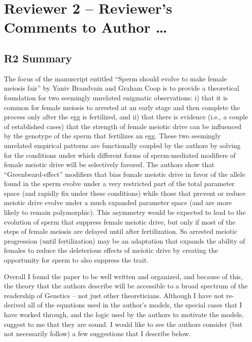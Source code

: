 \documentclass[12pt,letterpaper]{article}
\begin{document}
\newpage

\section*{Reviewer 2 -- Reviewer's Comments to Author \dots}

\subsection*{R2 Summary}
The focus of the manuscript entitled  ``Sperm should evolve to make female meiosis
fair'' by Yaniv Brandvain and Graham Coop is to provide a theoretical foundation
for two seemingly unrelated enigmatic observations: i) that it is common for
female meiosis to arrested at an early stage and then complete the process only
after the egg is fertilized, and ii) that there is evidence (i.e., a couple of
established cases) that the strength of female meiotic drive can be influenced
by the genotype of the sperm that fertilizes an egg.  These two seemingly
unrelated empirical patterns are functionally coupled by the authors by solving
for the conditions under which different forms of sperm-mediated modifiers of
female meiotic drive will be selectively favored.  The authors show that
``Greenbeard-effect'' modifiers that bias female meiotic drive in favor of the
allele found in the sperm evolve under a very restricted part of the total
parameter space (and rapidly fix under these conditions) while those that
prevent or reduce meiotic drive evolve under a much expanded parameter space
(and are more likely to remain polymorphic).  This asymmetry would be expected
to lead to the evolution of sperm that suppress female meiotic drive, but only
if most of the steps of female meiosis are delayed until after fertilization. So
arrested meiotic progression (until fertilization) may be an adaptation that
expands the ability of females to reduce the deleterious effects of meiotic
drive by creating the opportunity for sperm to also suppress the trait. 

	 Overall I found the paper to be well written and organized, and because of
this, the theory that the authors describe will be accessible to a broad
spectrum of the readership of Genetics -- not just other theoreticians.  Although
I have not re-derived all of the equations used in the author's models, the
special cases that I have worked through, and the logic used by the authors to
motivate the models, suggest to me that they are sound. I would like to see the
authors consider (but not necessarily follow) a few suggestions that I describe
below.  
\end{document}
